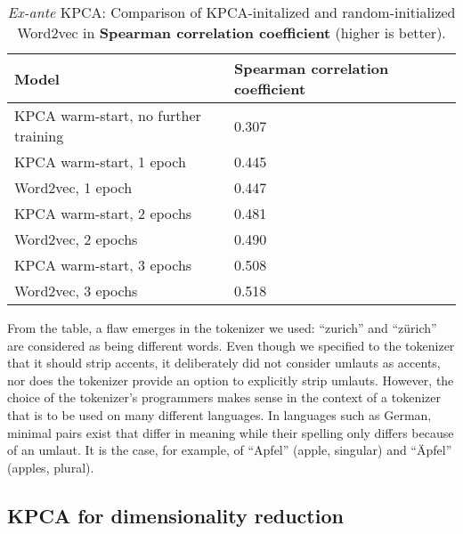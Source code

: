 
\begin{table}[h]

\centering

\begin{tabular}{|l|l|l|}
\hline
\rowcolor[HTML]{C0C0C0} 
\textbf{Model}          & \textbf{Spearman correlation coefficient} \\ \hline
KPCA warm-start, no further training & 0.307 \\ \hline
KPCA warm-start, 1 epoch & 0.445 \\ \hline
Word2vec, 1 epoch & 0.447 \\ \hline
KPCA warm-start, 2 epochs  & 0.481 \\ \hline
Word2vec, 2 epochs &  0.490 \\ \hline
KPCA warm-start, 3 epochs &  0.508 \\ \hline
Word2vec, 3 epochs & 0.518\\ \hline
\end{tabular}
\caption{\textit{Ex-ante} KPCA: Comparison of KPCA-initalized and random-initialized Word2vec in \textbf{Spearman correlation coefficient} (higher is better).}
\label{table:quant-1k-pre}
\end{table}

From the table, a flaw emerges in the tokenizer we used: ``zurich'' and ``zürich'' are considered as being different words.
Even though we specified to the tokenizer that it should strip accents, it deliberately did not consider umlauts as accents, nor does the tokenizer provide an option to explicitly strip umlauts.
However, the choice of the tokenizer's programmers makes sense in the context of a tokenizer that is to be used on many different languages.
In languages such as German, minimal pairs exist that differ in meaning while their spelling only differs because of an umlaut.
It is the case, for example, of ``Apfel'' (apple, singular) and ``Äpfel'' (apples, plural).

\subsection{KPCA for dimensionality reduction}

